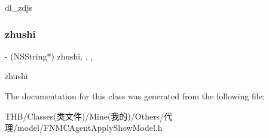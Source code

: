 dl\+\_\+zdjs \mbox{\label{interface_f_n_m_c_agent_apply_show_model_a5eb5c9d9d6249b34b3e288c81550f0d5}} 
\subsubsection{\texorpdfstring{zhushi}{zhushi}}
{\footnotesize\ttfamily -\/ (N\+S\+String$\ast$) zhushi\hspace{0.3cm}{\ttfamily [read]}, {\ttfamily [write]}, {\ttfamily [nonatomic]}, {\ttfamily [copy]}}

zhushi 

The documentation for this class was generated from the following file\+:\begin{DoxyCompactItemize}
\item 
T\+H\+B/\+Classes(类文件)/\+Mine(我的)/\+Others/代理/model/F\+N\+M\+C\+Agent\+Apply\+Show\+Model.\+h\end{DoxyCompactItemize}
